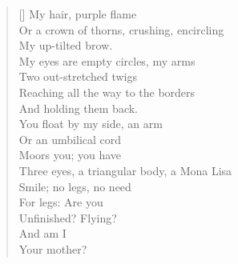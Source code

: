 \label{ch:onnena}
\settowidth{\versewidth}{Three eyes, a triangular body, a Mona Lisa}
\begin{verse}[\versewidth]
My hair, purple flame\\
Or a crown of thorns, crushing, encircling\\
My up-tilted brow.\\
My eyes are empty circles, my arms\\
Two out-stretched twigs\\
Reaching all the way to the borders\\
And holding them back.\\
You float by my side, an arm\\
Or an umbilical cord\\
Moors you; you have\\
Three eyes, a triangular body, a Mona Lisa\\
Smile; no legs, no need\\
For legs: Are you\\
Unfinished? Flying?\\
And am I\\
Your mother?
\end{verse}
